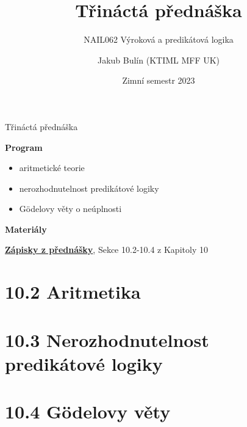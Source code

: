 \documentclass{beamer}
\title{Třináctá přednáška}
\subtitle{NAIL062 Výroková a predikátová logika}
\author{Jakub Bulín (KTIML MFF UK)}
\date{Zimní semestr 2023}
\begin{document}
\frame{\titlepage}


\begin{frame}{Třináctá přednáška}

    \textbf{Program}
        \begin{itemize}
            \item aritmetické teorie
            \item nerozhodnutelnost predikátové logiky
            \item Gödelovy věty o neúplnosti
        \end{itemize}      
    
    \textbf{Materiály}

        \href{https://github.com/jbulin-mff-uk/nail062/raw/main/lecture/lecture-notes/lecture-notes.pdf}{\alert{\textbf{Zápisky z přednášky}}}, Sekce 10.2-10.4 z Kapitoly 10

\end{frame}


\section{10.2 Aritmetika}


\section{10.3 Nerozhodnutelnost predikátové logiky}


\section{10.4 Gödelovy věty}
\end{document}
